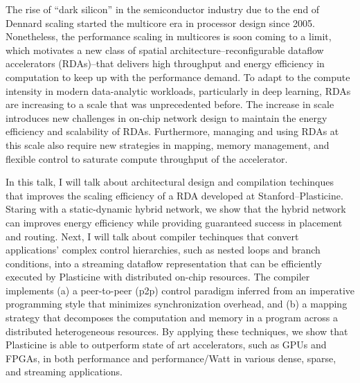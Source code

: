 
The rise of ``dark silicon'' in the semiconductor industry due to the end of Dennard scaling 
started the multicore era in processor design since 2005.
Nonetheless, the performance scaling in multicores is soon coming to a limit, which motivates a new
class of spatial architecture--reconfigurable dataflow accelerators (RDAs)--that delivers high throughput 
and energy efficiency in computation to keep up with the performance demand.
To adapt to the compute intensity in modern data-analytic workloads, particularly in deep learning, RDAs are increasing to a scale
that was unprecedented before.
The increase in scale introduces new challenges in on-chip network design to maintain the energy efficiency and scalability of RDAs.
Furthermore, managing and using RDAs at this scale also require new strategies in mapping, memory management, and flexible control
to saturate compute throughput of the accelerator. 

In this talk, I will talk about architectural design and compilation techinques that improves the scaling efficiency of a RDA developed 
at Stanford--Plasticine.
Staring with a static-dynamic hybrid network, we show that the hybrid network can improves energy efficiency while providing
guaranteed success in placement and routing.
Next, I will talk about compiler techinques that convert applications' complex control hierarchies, such as nested loops and branch conditions, into a streaming dataflow representation that can be efficiently executed by Plasticine with distributed on-chip resources.
The compiler implements (a) a peer-to-peer (p2p) control paradigm inferred from an imperative programming style that minimizes synchronization overhead, and (b) a mapping strategy that decomposes the computation and memory in a program across a distributed heterogeneous resources.
By applying these techniques, we show that Plasticine is able to outperform state of art accelerators, such as GPUs and FPGAs, in
both performance and performance/Watt in various dense, sparse, and streaming applications.
